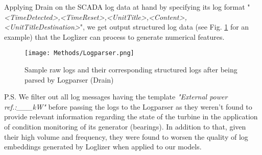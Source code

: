         Applying Drain on the SCADA log data at hand by specifying its log format "\emph{<TimeDetected>,<TimeReset>,<UnitTitle>,<Content>,<UnitTitleDestination>}", we get 
        output structured log data (see Fig. \ref{fig:logparser} for an example) that the Loglizer can process to generate numerical features.

      \begin{figure}[H]
        \begin{center}
          \texttt{[image: Methods/Logparser.png]}
        \end{center}
        \caption{Sample raw logs and their corresponding structured logs after being parsed by Logparser (Drain)}
        \label{fig:logparser}
      \end{figure}

        P.S. We filter out all log messages having the template \emph{} \emph{"External power ref.:\_\_\_kW"} before passing the logs to the Logparser
        as they weren't found to provide relevant information regarding the state of the turbine in the application of condition monitoring 
        of its generator (bearings). In addition to that, given their high volume and frequency, they were found to worsen the quality of 
        log embeddings generated by Loglizer when applied to our models.

